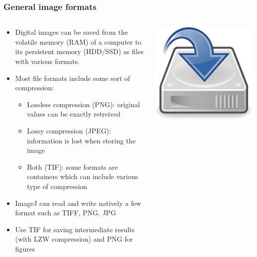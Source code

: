 \documentclass[ignorenonframetext,aspectratio=169,10pt,xcolor=table]{beamer}
\begin{document}
\begin{frame}
\begin{columns}
\begin{column}{.4\textwidth}
    \end{column}
  \end{columns}
\end{frame}

\begin{frame} \frametitle{General image formats}
  \begin{columns}
    \begin{column}{0.75\textwidth}
      \begin{itemize}
      \item Digital images can be saved from the volatile memory (RAM)
        of a computer to its persistent memory (HDD/SSD) as files with various
        formats.
      \item Most file formats include some sort of compression:
        \begin{itemize}
        \item Lossless compression (PNG): original values can be
          exactly retreived
        \item Lossy compression (JPEG): information is lost when
          storing the image
        \item Both (TIF): some formats are containers which can
          include various type of compression
        \end{itemize}
      \item ImageJ can read and write natively a few format such as
        TIFF, PNG, JPG
      \item Use TIF for saving intermediate results (with LZW
        compression) and PNG for figures
      \end{itemize}
    \end{column}
    \begin{column}{0.25\textwidth}
      \includegraphics[width=\textwidth]{drive}
    \end{column}
  \end{columns}
\end{frame}
\end{document}

